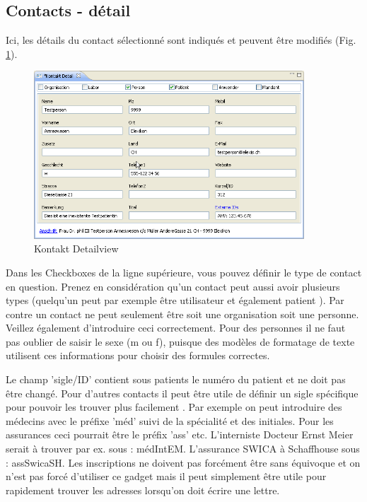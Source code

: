 \subsection{Contacts - détail}
Ici, les détails du contact sélectionné sont indiqués et peuvent être modifiés (Fig. \ref{fig:kontaktdetail}).
\begin{figure}[htp]
\begin{center}
  \includegraphics[width=0.9\textwidth]{images/kontaktdetail}
  \caption{Kontakt Detailview}
  \label{fig:kontaktdetail}
\end{center}
\end{figure}
Dans les Checkboxes de la ligne supérieure, vous pouvez définir le type de contact en question. Prenez en considération qu'un contact peut aussi avoir plusieurs types (quelqu'un peut par exemple être utilisateur et également patient ). Par contre un contact ne peut seulement être soit une organisation soit une personne. Veillez également d'introduire ceci correctement. Pour des personnes il ne faut pas oublier de saisir le sexe (m ou f), puisque des modèles de formatage de texte utilisent ces informations pour choisir des formules correctes.

\medskip

Le champ 'sigle/ID' contient sous patients le numéro du patient et ne doit pas être changé. Pour d'autres contacts il peut être utile de définir un sigle spécifique pour pouvoir les trouver plus facilement . Par exemple on peut introduire des médecins avec le préfixe 'méd' suivi de la spécialité et des initiales. Pour les assurances ceci pourrait être le préfix 'ass' etc. L'interniste Docteur Ernst Meier serait à trouver par ex. sous : médIntEM.
L'assurance SWICA à Schaffhouse sous : assSwicaSH.
Les inscriptions ne doivent pas forcément être sans équivoque et on n'est pas forcé d'utiliser ce gadget mais il peut simplement être utile pour rapidement trouver les adresses lorsqu'on doit écrire une lettre.

